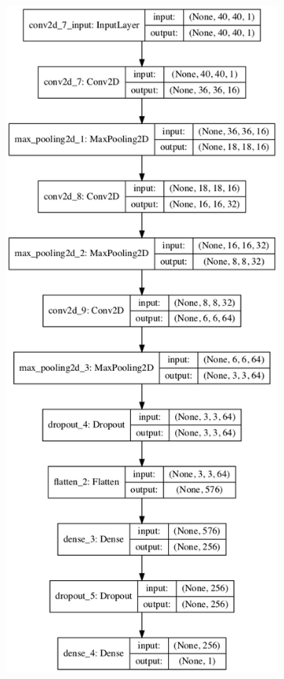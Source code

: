 \documentclass[a4paper,fleqn,usenatbib]{mnras}
\begin{document}
 \begin{figure}

 \begin{subfigure}{0.8\columnwidth}
 \includegraphics[width=\columnwidth]{../Figures/CNN_model_self} 

\end{subfigure}
\end{figure}
\end{document}
